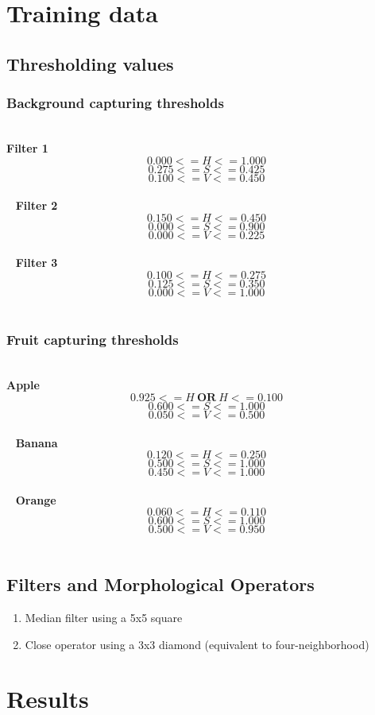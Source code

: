 \documentclass{article}
\begin{document}
\section{Training data}
\subsection{Thresholding values}
\label{subsec:process:filters}
\subsubsection{Background capturing thresholds}
\label{subsubsec:process:filters:background}
~\\
\textbf{Filter 1}
\[0.000 <= H <= 1.000\]
\[0.275 <= S <= 0.425\]
\[0.100 <= V <= 0.450\]\\
~
\textbf{Filter 2}
\[0.150 <= H <= 0.450\]
\[0.000 <= S <= 0.900\]
\[0.000 <= V <= 0.225\]\\
~
\textbf{Filter 3}
\[0.100 <= H <= 0.275\]
\[0.125 <= S <= 0.350\]
\[0.000 <= V <= 1.000\]\\

\subsubsection{Fruit capturing thresholds}
\label{subsubsec:process:filters:fruit}
~\\
\textbf{Apple}
\[0.925 <= H\ \textbf{OR}\ H <= 0.100\]
\[0.600 <= S <= 1.000\]
\[0.050 <= V <= 0.500\]\\
~
\textbf{Banana}
\[0.120 <= H <= 0.250\]
\[0.500 <= S <= 1.000\]
\[0.450 <= V <= 1.000\]\\
~
\textbf{Orange}
\[0.060 <= H <= 0.110\]
\[0.600 <= S <= 1.000\]
\[0.500 <= V <= 0.950\]\\

\subsection{Filters and Morphological Operators}
\label{subsec:process:filtmorph}
\begin{enumerate}
\item Median filter using a 5x5 square
\item Close operator using a 3x3 diamond (equivalent to four-neighborhood)
\end{enumerate}

\section{Results}
\end{document}
